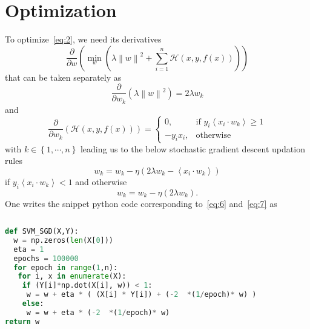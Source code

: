 \documentclass[a4paper,11pt]{article}
\begin{document}
\section{Optimization}\label{sec-3}
To optimize~\eqref{eq:2}, we need its derivatives
%
\begin{equation}
\frac{\partial}{\partial w}
\left(
\min_{w}{
           \left(
           \lambda\left\|w\right\|^2 +
           \sum_{i=1}^{n}
           {
           \mathcal{H}
           \left(x,y,f\left(x\right)\right)
           }
           \right)
        }
\right)
\label{eq:3}
\end{equation}
%
that can be taken separately as 
%
\begin{equation}
\frac{\partial}{\partial w_{k}}
\left(
	\lambda\left\|w\right\|^2
\right)= 2\lambda w_{k}
\label{eq:4}
\end{equation}
%
and
%
\begin{equation}
\frac{\partial}{\partial w_{k}}
\left(
	\mathcal{H}\left(x,y,f\left(x\right)\right)
\right)
= 
\begin{cases}
   0 , & \text{if }  y_i \left<x_i\cdot w_{k}\right> \geq 1\\
   -y_i x_i , & \text{otherwise}
\end{cases}
\label{eq:5}
\end{equation}
%
with $k\in\left\{1,\cdots,n\right\}$ leading us to the below stochastic gradient descent updation rules
%
\begin{equation}
w_k=w_k - \eta \left( 2\lambda w_k - \left<x_i\cdot w_{k}\right> \right)
\label{eq:6}
\end{equation}
%
if $y_i \left<x_i\cdot w_{k}\right> < 1$ and otherwise
%
\begin{equation}
w_k=w_k - \eta \left( 2\lambda w_k \right).
\label{eq:7}
\end{equation}
%
One writes the snippet python code corresponding to~\eqref{eq:6} and~\eqref{eq:7} as
%
\begin{lstlisting}[language=Python]
    
def SVM_SGD(X,Y):
  w = np.zeros(len(X[0]))
  eta = 1
  epochs = 100000
  for epoch in range(1,n):
   for i, x in enumerate(X):
    if (Y[i]*np.dot(X[i], w)) < 1:
	 w = w + eta * ( (X[i] * Y[i]) + (-2  *(1/epoch)* w) )
	else:
	 w = w + eta * (-2  *(1/epoch)* w)
return w
\end{lstlisting}
%
\end{document}
